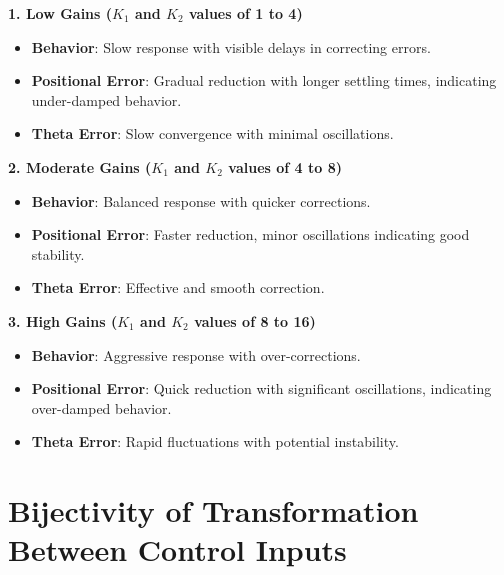 \documentclass[12pt]{article}
\begin{document}
\textbf{1. Low Gains (\( K_1 \) and \( K_2 \) values of 1 to 4)}
\begin{itemize}
    \item \textbf{Behavior}: Slow response with visible delays in correcting errors.
    \item \textbf{Positional Error}: Gradual reduction with longer settling times, indicating under-damped behavior.
    \item \textbf{Theta Error}: Slow convergence with minimal oscillations.
\end{itemize}
\textbf{2. Moderate Gains (\( K_1 \) and \( K_2 \) values of 4 to 8)}
\begin{itemize}
    \item \textbf{Behavior}: Balanced response with quicker corrections.
    \item \textbf{Positional Error}: Faster reduction, minor oscillations indicating good stability.
    \item \textbf{Theta Error}: Effective and smooth correction.
\end{itemize}
\textbf{3. High Gains (\( K_1 \) and \( K_2 \) values of 8 to 16)}
\begin{itemize}
    \item \textbf{Behavior}: Aggressive response with over-corrections.
    \item \textbf{Positional Error}: Quick reduction with significant oscillations, indicating over-damped behavior.
    \item \textbf{Theta Error}: Rapid fluctuations with potential instability.
\end{itemize}


\section{Bijectivity of Transformation Between Control Inputs}
\end{document}
